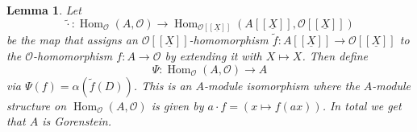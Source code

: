 \documentclass{article}
\theoremstyle{plain}%
\newtheorem{lemma}{Lemma}[section]
\theoremstyle{definition}
\theoremstyle{remark}
\renewcommand{\hom}{\operatorname{Hom}}
\begin{document}
\begin{lemma}\textup{\cite[lemma 5.15]{darmon1995fermat}}\label{lem:gorenstein}
    Let 
    \[
        \!\tilde{\cdot}\colon \hom_\mathcal{O}(A, \mathcal{O}) \to 
        \hom_{\mathcal{O}[[\underline{X}]]}(A[[\underline{X}]], \mathcal{O}[[\underline{X}]])
    \]
    be the map that assigns an \(\mathcal{O}[[\underline{X}]]\)-homomorphism
    \(\tilde f\colon A[[\underline{X}]] \to \mathcal{O}[[\underline{X}]]\) to the \(\mathcal{O}\)-homomorphism
    \(f \colon A \to \mathcal{O}\) by extending it with \(X \mapsto X\).
    Then define
    \[
        \Psi \colon \hom_\mathcal{O}(A, \mathcal{O}) \to A  
    \]
    via \(\Psi(f) = \alpha(\tilde{f}(D))\).
    This is an \(A\)-module isomorphism where the \(A\)-module structure on \(\hom_\mathcal{O}(A, \mathcal{O})\)
    is given by \(a \cdot f = (x \mapsto f(ax))\).
    In total we get that \(A\) is Gorenstein.
\end{lemma}
\end{document}
